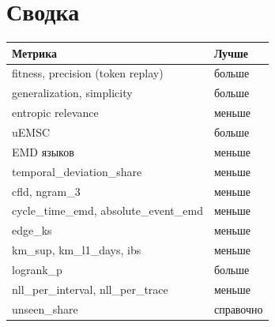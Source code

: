 \documentclass[11pt,a4paper]{article}
\newcommand{\1}{\mathbf{1}}
\begin{document}
\section{Сводка}

\begin{center}
\begin{tabular}{@{}ll@{}}
\toprule
Метрика & Лучше \\
\midrule
fitness, precision (token replay) & больше \\
generalization, simplicity & больше \\
entropic relevance & меньше \\
uEMSC & больше \\
EMD языков & меньше \\
temporal\_deviation\_share & меньше \\
cfld, ngram\_3 & меньше \\
cycle\_time\_emd, absolute\_event\_emd & меньше \\
edge\_ks & меньше \\
km\_sup, km\_l1\_days, ibs & меньше \\
logrank\_p & больше \\
nll\_per\_interval, nll\_per\_trace & меньше \\
unseen\_share & справочно \\
\bottomrule
\end{tabular}
\end{center}
\end{document}
